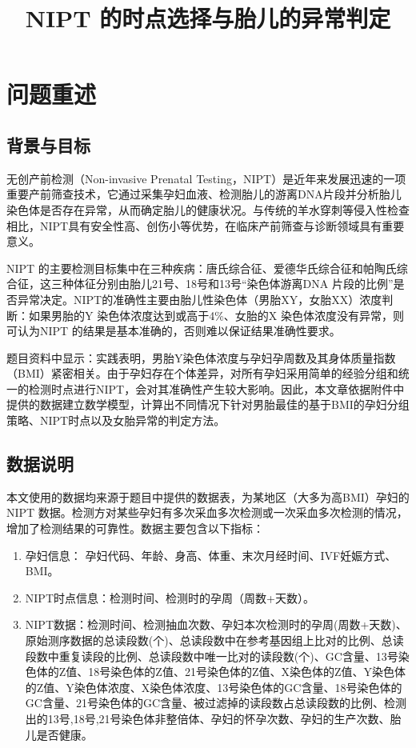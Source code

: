 \documentclass[withoutpreface]{cumcmthesis}
\title{NIPT 的时点选择与胎儿的异常判定}
\begin{document}
\maketitle

\begin{abstract}
\keywords{}
\end{abstract}

\section{问题重述}
\subsection{背景与目标}
无创产前检测（Non-invasive Prenatal Testing，NIPT）是近年来发展迅速的一项重要产前筛查技术，它通过采集孕妇血液、检测胎儿的游离DNA片段并分析胎儿染色体是否存在异常，从而确定胎儿的健康状况。与传统的羊水穿刺等侵入性检查相比，NIPT具有安全性高、创伤小等优势，在临床产前筛查与诊断领域具有重要意义。

NIPT 的主要检测目标集中在三种疾病：唐氏综合征、爱德华氏综合征和帕陶氏综合征，这三种体征分别由胎儿21号、18号和13号“染色体游离DNA 片段的比例”是否异常决定。NIPT的准确性主要由胎儿性染色体（男胎XY，女胎XX）浓度判断：如果男胎的Y 染色体浓度达到或高于4\%、女胎的X 染色体浓度没有异常，则可认为NIPT 的结果是基本准确的，否则难以保证结果准确性要求。

题目资料中显示：实践表明，男胎Y染色体浓度与孕妇孕周数及其身体质量指数（BMI）紧密相关。由于孕妇存在个体差异，对所有孕妇采用简单的经验分组和统一的检测时点进行NIPT，会对其准确性产生较大影响。因此，本文章依据附件中提供的数据建立数学模型，计算出不同情况下针对男胎最佳的基于BMI的孕妇分组策略、NIPT时点以及女胎异常的判定方法。
\subsection{数据说明}
本文使用的数据均来源于题目中提供的数据表，为某地区（大多为高BMI）孕妇的NIPT 数据。检测方对某些孕妇有多次采血多次检测或一次采血多次检测的情况，增加了检测结果的可靠性。数据主要包含以下指标：
\begin{enumerate}
    \item 孕妇信息： 孕妇代码、年龄、身高、体重、末次月经时间、IVF妊娠方式、BMI。
    \item NIPT时点信息：检测时间、检测时的孕周（周数+天数）。
    \item NIPT数据：检测时间、检测抽血次数、孕妇本次检测时的孕周(周数+天数)、原始测序数据的总读段数(个)、总读段数中在参考基因组上比对的比例、总读段数中重复读段的比例、总读段数中唯一比对的读段数(个)、GC含量、13号染色体的Z值、18号染色体的Z值、21号染色体的Z值、X染色体的Z值、Y染色体的Z值、Y染色体浓度、X染色体浓度、13号染色体的GC含量、18号染色体的GC含量、21号染色体的GC含量、被过滤掉的读段数占总读段数的比例、检测出的13号,18号,21号染色体非整倍体、孕妇的怀孕次数、孕妇的生产次数、胎儿是否健康。
\end{enumerate}
\end{document}
